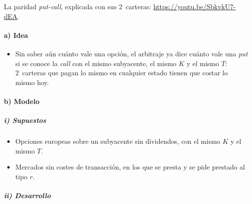 \documentclass[11pt]{article}
\begin{document}
\begin{anotaciones}
La paridad \emph{put-call}, explicada con sus 2~carteras: \url{https://youtu.be/SbkvkU7-dEA}.
\end{anotaciones}

\paragraph{a) Idea}

\begin{itemize}
\item Sin saber aún cuánto vale una opción, el arbitraje ya dice cuánto vale una \emph{put} si se conoce la \emph{call} con el mismo subyacente, el mismo $K$ y el mismo $T$: 2~carteras que pagan lo mismo en cualquier estado tienen que costar lo mismo hoy.
\end{itemize}

\paragraph{b) Modelo}

\subparagraph{i) Supuestos}

\begin{itemize}
\item Opciones europeas sobre un subyacente sin dividendos, con el mismo $K$ y el mismo $T$.
\item Mercados sin costes de transacción, en los que se presta y se pide prestado al tipo $r$.
\end{itemize}

\subparagraph{ii) Desarrollo}
\end{document}
